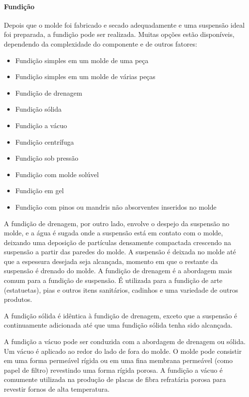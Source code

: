 \paragraph*{Fundição}

Depois que o molde foi fabricado e secado adequadamente e uma suspensão ideal foi preparada, a fundição pode ser realizada. Muitas opções estão disponíveis, dependendo da complexidade do componente e de outros fatores:

\begin{itemize}
    \item Fundição simples em um molde de uma peça
    \item Fundição simples em um molde de várias peças
    \item Fundição de drenagem
    \item Fundição sólida
    \item Fundição a vácuo
    \item Fundição centrífuga
    \item Fundição sob pressão
    \item Fundição com molde solúvel
    \item Fundição em gel
    \item Fundição com pinos ou mandris não absorventes inseridos no molde
\end{itemize}

A fundição de drenagem, por outro lado, envolve o despejo da suspensão no molde, e a água é sugada onde a suspensão está em contato com o molde, deixando uma deposição de partículas densamente compactada crescendo na suspensão a partir das paredes do molde. A suspensão é deixada no molde até que a espessura desejada seja alcançada, momento em que o restante da suspensão é drenado do molde. A fundição de drenagem é a abordagem mais comum para a fundição de suspensão. É utilizada para a fundição de arte (estatuetas), pias e outros itens sanitários, cadinhos e uma variedade de outros produtos.

A fundição sólida é idêntica à fundição de drenagem, exceto que a suspensão é continuamente adicionada até que uma fundição sólida tenha sido alcançada.

A fundição a vácuo pode ser conduzida com a abordagem de drenagem ou sólida. Um vácuo é aplicado ao redor do lado de fora do molde. O molde pode consistir em uma forma permeável rígida ou em uma fina membrana permeável (como papel de filtro) revestindo uma forma rígida porosa. A fundição a vácuo é comumente utilizada na produção de placas de fibra refratária porosa para revestir fornos de alta temperatura.

